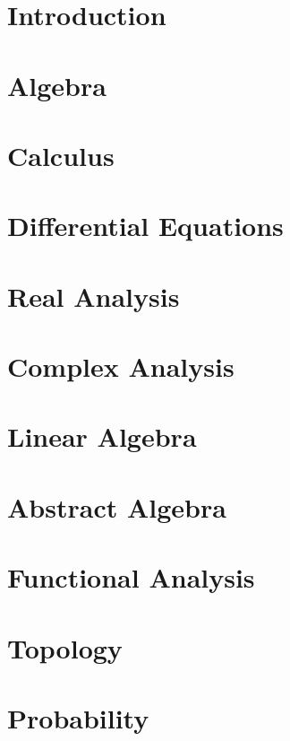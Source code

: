 \documentclass[openany]{book} %
\begin{document}


\tableofcontents

\chapter*{Introduction}


\chapter{Algebra}

\chapter{Calculus}

\chapter{Differential Equations}

\chapter{Real Analysis}

\chapter{Complex Analysis}

\chapter{Linear Algebra}

\chapter{Abstract Algebra}

\chapter{Functional Analysis}

\chapter{Topology}

\chapter{Probability}

\end{document}
